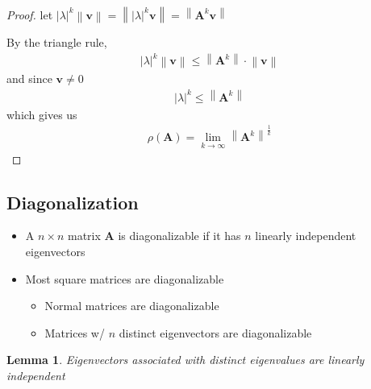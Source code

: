 \documentclass[letterpaper,12pt]{article}
\newcommand{\vect}[1]{\mathbf{#1}}
\newcommand{\matr}[1]{\mathbf{#1}}
\newcommand{\norm}[1]{\left\lVert#1\right\rVert}
\newcommand{\abs}[1]{\lvert#1\rvert}
\newtheorem{lem}{Lemma}
\begin{document}
\begin{proof}
 let $\abs{\lambda}^k\norm{\vect{v}} = \norm{\abs{\lambda}^k \vect{v}} = \norm{\matr{A}^k \vect{v}}$

 By the triangle rule,
 \begin{align}
  \abs{\lambda}^k\norm{\vect{v}} \leq \norm{\matr{A}^k} \cdot \norm{\vect{v}}
 \end{align}
 and since $\vect{v} \neq 0$
 \begin{align}
  \abs{\lambda}^k \leq \norm{\matr{A}^k}
 \end{align}
 which gives us
 \begin{align}
  \rho(\matr{A}) = \lim_{k \to \infty} \norm{\matr{A}^k}^{\frac{1}{k}}
 \end{align}
\end{proof}

\subsection{Diagonalization}
\begin{itemize}
 \item A $n \times n$ matrix $\matr{A}$ is diagonalizable if it has $n$ linearly independent eigenvectors
 \item Most square matrices are diagonalizable
       \begin{itemize}
        \item Normal matrices are diagonalizable
        \item Matrices w/ $n$ distinct eigenvectors are diagonalizable
       \end{itemize}
\end{itemize}
\begin{lem}
 Eigenvectors associated with distinct eigenvalues are linearly independent
\end{lem}
\end{document}
